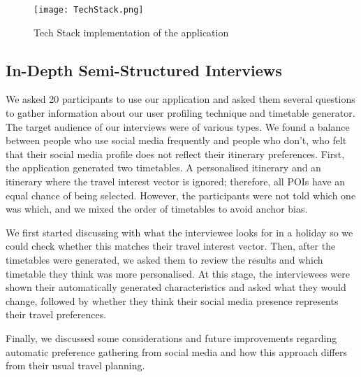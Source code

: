 \begin{figure}[h]
\centering
\texttt{[image: TechStack.png]}
\caption{Tech Stack implementation of the application} \label{TechStack}
\end{figure}
\subsection{In-Depth Semi-Structured Interviews}

We asked 20 participants to use our application and asked them several
questions to gather information about our user profiling technique and
timetable generator. The target audience of our interviews were of various
types. We found a balance between people who use social media frequently and
people who don't, who felt that their social media profile does not reflect
their itinerary preferences. First, the application generated two timetables. A
personalised itinerary and an itinerary where the travel interest vector is
ignored; therefore, all POIs have an equal chance of being selected. However,
the participants were not told which one was which, and we mixed the order of
timetables to avoid anchor bias. 


We first started discussing with what the interviewee looks
for in a holiday  so we
could check whether this matches their travel interest
vector. Then, after the timetables were generated, we
asked them to review the results and which timetable they
think was more personalised.  At this stage, the
interviewees were shown their automatically generated
characteristics and asked what they would change,
followed by whether they think their social media
presence represents their travel preferences.

Finally, we discussed some considerations and future
improvements regarding automatic preference gathering
from social media and how this approach differs from
their usual travel planning.
